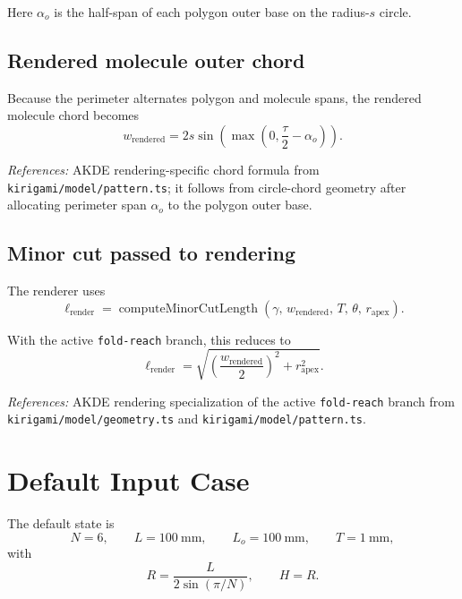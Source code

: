 \documentclass[11pt]{article}
\newcommand{\formularefs}[1]{%
\par\smallskip
\noindent\footnotesize\textit{References: }#1
\par\smallskip\normalsize
}
\begin{document}
Here $\alpha_o$ is the half-span of each polygon outer base on the radius-$s$ circle.

\subsection{Rendered molecule outer chord}

Because the perimeter alternates polygon and molecule spans, the rendered molecule
chord becomes
\begin{equation}
w_{\mathrm{rendered}} = 2s\sin\!\left(\max\!\left(0,\frac{\tau}{2}-\alpha_o\right)\right).
\end{equation}

\formularefs{AKDE rendering-specific chord formula from \texttt{kirigami/model/pattern.ts}; it follows from circle-chord geometry after allocating perimeter span \(\alpha_o\) to the polygon outer base.}

\subsection{Minor cut passed to rendering}

The renderer uses
\begin{equation}
\ell_{\mathrm{render}} =
\operatorname{computeMinorCutLength}\!\left(\gamma,\,w_{\mathrm{rendered}},\,T,\,\theta,\,r_{\mathrm{apex}}\right).
\end{equation}

With the active \texttt{fold-reach} branch, this reduces to
\[
\ell_{\mathrm{render}} =
\sqrt{\left(\frac{w_{\mathrm{rendered}}}{2}\right)^2 + r_{\mathrm{apex}}^2}.
\]

\formularefs{AKDE rendering specialization of the active \texttt{fold-reach} branch from \texttt{kirigami/model/geometry.ts} and \texttt{kirigami/model/pattern.ts}.}

\section{Default Input Case}

The default state is
\[
N=6,
\qquad
L=100~\mathrm{mm},
\qquad
L_o=100~\mathrm{mm},
\qquad
T=1~\mathrm{mm},
\]
with
\[
R = \frac{L}{2\sin(\pi/N)},
\qquad
H = R.
\]
\end{document}
